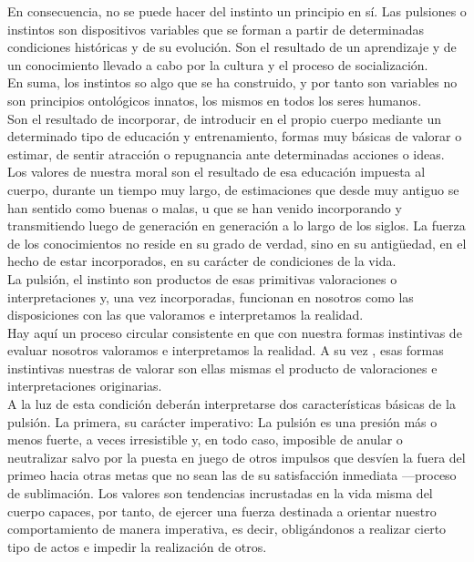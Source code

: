 \documentclass[a4paper, 10pt, twocolumn, spanish]{article}
\begin{document}
En consecuencia, no se puede hacer del instinto un principio en
sí. Las pulsiones o instintos son dispositivos variables que se forman
a partir de determinadas condiciones históricas y de su evolución. Son
el resultado de un aprendizaje y de un conocimiento llevado a cabo por
la cultura y el proceso de socialización.\\[0pt]
En suma, los instintos so algo que se ha construido, y por tanto son
variables no son principios ontológicos innatos, los mismos en todos
los seres humanos.\\[0pt]
Son el resultado de incorporar, de introducir en el propio cuerpo
mediante un determinado tipo de educación y entrenamiento, formas muy
básicas de valorar o estimar, de sentir atracción o repugnancia ante
determinadas acciones o ideas.\\[0pt]
Los valores de nuestra moral son el resultado de esa educación
impuesta al cuerpo, durante un tiempo muy largo, de estimaciones que
desde muy antiguo se han sentido como buenas o malas, u que se han
venido incorporando y transmitiendo luego de generación en generación
a lo largo de los siglos. La fuerza de los conocimientos no reside en
su grado de verdad, sino en su antigüedad, en el hecho de estar
incorporados, en su carácter de condiciones de la vida.\\[0pt]

La pulsión, el instinto son productos de esas primitivas valoraciones
o interpretaciones y, una vez incorporadas, funcionan en nosotros como
las disposiciones con las que valoramos e interpretamos la realidad.\\[0pt]
Hay aquí un proceso circular consistente en que con nuestra formas
instintivas de evaluar nosotros valoramos e interpretamos la
realidad. A su vez , esas formas instintivas nuestras de valorar son
ellas mismas el producto de valoraciones e interpretaciones
originarias.\\[0pt]

A la luz de esta condición deberán interpretarse dos características
básicas de la pulsión. La primera, su carácter imperativo: La pulsión
es una presión más o menos fuerte, a veces irresistible y, en todo
caso, imposible de anular o neutralizar salvo por la puesta en juego
de otros impulsos que desvíen la fuera del primeo hacia otras metas
que no sean las de su satisfacción inmediata —proceso de
sublimación. Los valores son tendencias incrustadas en la vida misma
del cuerpo capaces, por tanto, de ejercer una fuerza destinada a
orientar nuestro comportamiento de manera imperativa, es decir,
obligándonos a realizar cierto tipo de actos e impedir la realización
de otros.\\[0pt]
\end{document}
